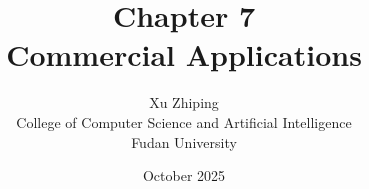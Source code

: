 \documentclass[11pt,letterpaper]{book}
\begin{document}
\title{Chapter 7\\
\large Commercial Applications}
\author{Xu Zhiping\\
\small College of Computer Science and Artificial Intelligence\\
\small Fudan University}
\date{October 2025}
\maketitle

\tableofcontents

\setcounter{chapter}{6}




\printindex
\end{document}
